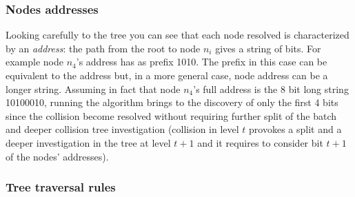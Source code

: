\documentclass[12pt,a4paper]{report}
\begin{document}
\subsubsection{Nodes addresses}

Looking carefully to the tree you can see that each node resolved is characterized by an \emph{address}: the path from the root to node $n_{i}$ gives  a string of bits. For example node $n_{4}$'s address has as prefix 1010. The prefix in this case can be equivalent to the address but, in a more general case, node address can be a longer string. Assuming in fact that node $n_{4}$'s full address is the 8 bit long string 10100010, running the algorithm brings to the discovery of only the first 4 bits since the collision become resolved without requiring further split of the batch and deeper collision tree investigation (collision in level $t$ provokes a split and a deeper investigation in the tree at level $t+1$ and it requires to consider bit $t+1$ of the nodes' addresses).\\

\subsubsection{Tree traversal rules}
\end{document}
